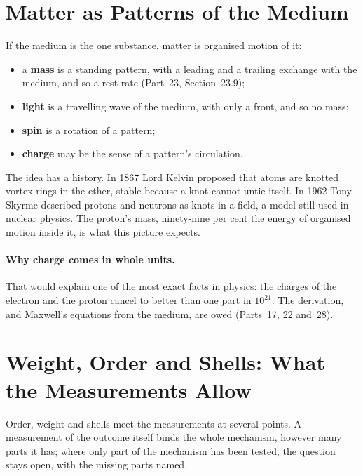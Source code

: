 \documentclass[11pt,a4paper]{article}
\begin{document}
\section{Matter as Patterns of the Medium}
\label{sec:matter}

\begin{hypbar}
If the medium is the one substance, matter is organised motion of it:
\begin{itemize}
\item a \textbf{mass} is a standing pattern, with a leading and a trailing exchange with the medium, and so a rest rate (Part~23, Section~23.9);
\item \textbf{light} is a travelling wave of the medium, with only a front, and so no mass;
\item \textbf{spin} is a rotation of a pattern;
\item \textbf{charge} may be the sense of a pattern's circulation.
\end{itemize}
\end{hypbar}

The idea has a history. In 1867 Lord Kelvin proposed that atoms are knotted vortex rings in the ether, stable because a knot cannot untie itself. In 1962 Tony Skyrme described protons and neutrons as knots in a field, a model still used in nuclear physics. The proton's mass, ninety-nine per cent the energy of organised motion inside it, is what this picture expects.

\paragraph{Why charge comes in whole units.}  That would explain one of the most exact facts in physics: the charges of the electron and the proton cancel to better than one part in $10^{21}$. The derivation, and Maxwell's equations from the medium, are owed (Parts~17, 22 and~28).

\section{Weight, Order and Shells: What the Measurements Allow}
\label{sec:not}

Order, weight and shells meet the measurements at several points. A measurement of the outcome itself binds the whole mechanism, however many parts it has; where only part of the mechanism has been tested, the question stays open, with the missing parts named.
\end{document}
